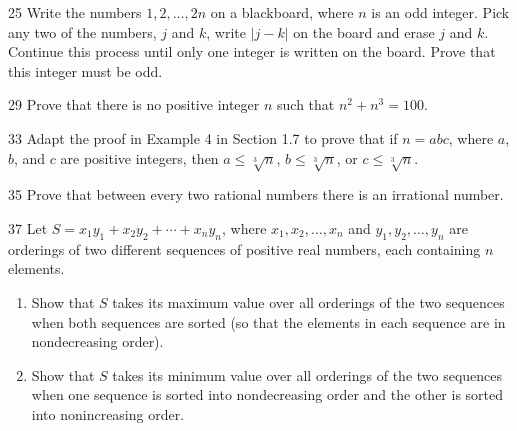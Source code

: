 \documentclass[11pt]{article}
\begin{document}
\begin{exercise}{25}
    Write the numbers $1, 2, \dots, 2n$ on a blackboard, where $n$ is
    an odd integer. Pick any two of the numbers, $j$ and $k$, write
    $|j - k|$ on the board and erase $j$ and $k$. Continue this process
    until only one integer is written on the board. Prove that this
    integer must be odd.
\end{exercise}

\begin{exercise}{29}
    Prove that there is no positive integer $n$ such that
    $n^2 + n^3 = 100$.
\end{exercise}

\begin{exercise}{33}
    Adapt the proof in Example 4 in Section 1.7 to prove that if
    $n = abc$, where $a$, $b$, and $c$ are positive integers, then
    $a \leq \sqrt[3]{n}$, $b \leq \sqrt[3]{n}$, or $c \leq \sqrt[3]{n}$.
\end{exercise}

\begin{exercise}{35}
    Prove that between every two rational numbers there is an
    irrational number.
\end{exercise}

\begin{exercise}{37}
    Let $S = x_1y_1 + x_2y_2 + \cdots + x_ny_n$, where
    $x_1, x_2, \dots, x_n$ and $y_1, y_2, \dots, y_n$ are orderings of
    two different sequences of positive real numbers, each containing
    $n$ elements.
    \begin{enumerate}[label=(\alph*)]
        \item Show that $S$ takes its maximum value over all orderings
        of the two sequences when both sequences are sorted (so that
        the elements in each sequence are in nondecreasing order).
        \item Show that $S$ takes its minimum value over all orderings
        of the two sequences when one sequence is sorted into
        nondecreasing order and the other is sorted into nonincreasing
        order.
    \end{enumerate}
\end{exercise}
\end{document}
